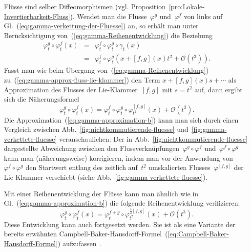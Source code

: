 Flüsse sind selber Diffeomorphismen (vgl. Proposition~\ref{pro:Lokale-Invertierbarkeit-Fluss}).
Wendet man die Flüsse~$\varphi^{g}$ und~$\varphi^{f}$ von links
auf Gl.~(\ref{eq:gamma-verkettung-der-Fluesse}) an, so erhält man
unter Berücksichtigung von~(\ref{eq:gamma-Reihenentwicklung}) die
Beziehung 
\[
\begin{array}{lcl}
\varphi_{t}^{g}\circ\varphi_{t}^{f}(x) & = & \varphi_{t}^{f}\circ\varphi_{t}^{g}\circ\gamma_{t}(x)\\
 & = & \varphi_{t}^{f}\circ\varphi_{t}^{g}\left(x+[f,g](x)t^{2}+\mathcal{O}(t^{3})\right).
\end{array}
\]
Fasst man wie beim Übergang von~(\ref{eq:gamma-Reihenentwicklung})
zu~(\ref{eq:gamma-approx-fluss-lie-klammer}) den Term $x+[f,g](x)s+\cdots$
als Approximation des Flusses der Lie-Klammer~$[f,g]$ mit $s=t^{2}$
auf, dann ergibt sich die Näherungsformel 
\begin{equation}
\varphi_{t}^{g}\circ\varphi_{t}^{f}(x)=\varphi_{t}^{f}\circ\varphi_{t}^{g}\circ\varphi_{t^{2}}^{[f,g]}(x)+\mathcal{O}(t^{3}).\label{eq:gamma-approximation-b}
\end{equation}
Die Approximation~(\ref{eq:gamma-approximation-b}) kann man sich
durch einen Vergleich zwischen Abb.~\ref{fig:nichtkommutierende-fluesse}
und~\ref{fig:gamma-verkettete-fluesse} veranschaulichen: Der in
Abb.~\ref{fig:nichtkommutierende-fluesse} dargestellte Abweichung
zwischen den Flussverknüpfungen~$\varphi^{g}\circ\varphi^{f}$ und~$\varphi^{f}\circ\varphi^{g}$
kann man (näherungsweise) korrigieren, indem man vor der Anwendung
von~$\varphi^{f}\circ\varphi^{g}$ den Startwert entlang des zeitlich
auf~$t^{2}$ umskalierten Flusses~$\varphi^{[f,g]}$ der Lie-Klammer
verschiebt (siehe Abb.~\ref{fig:gamma-verkettete-fluesse}).

Mit einer Reihenentwicklung der Flüsse kann man ähnlich wie in Gl.~(\ref{eq:gamma-approximation-b})
die folgende Reihenentwicklung verifizieren: 
\begin{equation}
\varphi_{t}^{g}\circ\varphi_{t}^{f}(x)=\varphi_{t}^{f+g}\circ\varphi_{t^{2}}^{\frac{1}{2}[f,g]}(x)+\mathcal{O}(t^{3}).\label{eq:gamma-approximation-CBH}
\end{equation}
Diese Entwicklung kann auch fortgesetzt werden. Sie ist als eine Variante
der bereits erwähnten Campbell-Baker-Hausdorff-Formel~(\ref{eq:Campbell-Baker-Hausdorff-Formel})
aufzufassen~\cite[Theorem~{2.12.4}]{varadarajan1984}.

